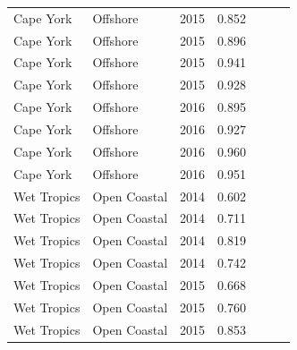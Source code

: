 \begin{longtable}{llccccc}
  Cape York & Offshore & 2015 & 0.852 & \cellcolor[HTML]{00734D}{A} & \cellcolor[HTML]{00734D}{A} & \cellcolor[HTML]{00734D}{A} \\ 
  Cape York & Offshore & 2015 & 0.896 & \cellcolor[HTML]{00734D}{A} & \cellcolor[HTML]{00734D}{A} & \cellcolor[HTML]{00734D}{A} \\ 
  Cape York & Offshore & 2015 & 0.941 & \cellcolor[HTML]{00734D}{A} & \cellcolor[HTML]{00734D}{A} & \cellcolor[HTML]{00734D}{A} \\ 
  Cape York & Offshore & 2015 & 0.928 & \cellcolor[HTML]{00734D}{A} & \cellcolor[HTML]{00734D}{A} & \cellcolor[HTML]{00734D}{A} \\ 
  Cape York & Offshore & 2016 & 0.895 & \cellcolor[HTML]{00734D}{A} & \cellcolor[HTML]{00734D}{A} & \cellcolor[HTML]{00734D}{A} \\ 
  Cape York & Offshore & 2016 & 0.927 & \cellcolor[HTML]{00734D}{A} & \cellcolor[HTML]{00734D}{A} & \cellcolor[HTML]{00734D}{A} \\ 
  Cape York & Offshore & 2016 & 0.960 & \cellcolor[HTML]{00734D}{A} & \cellcolor[HTML]{00734D}{A} & \cellcolor[HTML]{00734D}{A} \\ 
  Cape York & Offshore & 2016 & 0.951 & \cellcolor[HTML]{00734D}{A} & \cellcolor[HTML]{00734D}{A} & \cellcolor[HTML]{00734D}{A} \\ 
  Wet Tropics & Open Coastal & 2014 & 0.602 & \cellcolor[HTML]{F0C918}{C} & \cellcolor[HTML]{B0D235}{B} & \cellcolor[HTML]{F0C918}{C} \\ 
  Wet Tropics & Open Coastal & 2014 & 0.711 & \cellcolor[HTML]{B0D235}{B} & \cellcolor[HTML]{B0D235}{B} & \cellcolor[HTML]{B0D235}{B} \\ 
  Wet Tropics & Open Coastal & 2014 & 0.819 & \cellcolor[HTML]{B0D235}{B} & \cellcolor[HTML]{00734D}{A} & \cellcolor[HTML]{B0D235}{B} \\ 
  Wet Tropics & Open Coastal & 2014 & 0.742 & \cellcolor[HTML]{B0D235}{B} & \cellcolor[HTML]{B0D235}{B} & \cellcolor[HTML]{B0D235}{B} \\ 
  Wet Tropics & Open Coastal & 2015 & 0.668 & \cellcolor[HTML]{B0D235}{B} & \cellcolor[HTML]{B0D235}{B} & \cellcolor[HTML]{B0D235}{B} \\ 
  Wet Tropics & Open Coastal & 2015 & 0.760 & \cellcolor[HTML]{B0D235}{B} & \cellcolor[HTML]{B0D235}{B} & \cellcolor[HTML]{B0D235}{B} \\ 
  Wet Tropics & Open Coastal & 2015 & 0.853 & \cellcolor[HTML]{00734D}{A} & \cellcolor[HTML]{00734D}{A} & \cellcolor[HTML]{00734D}{A} \\ 

\end{longtable}
